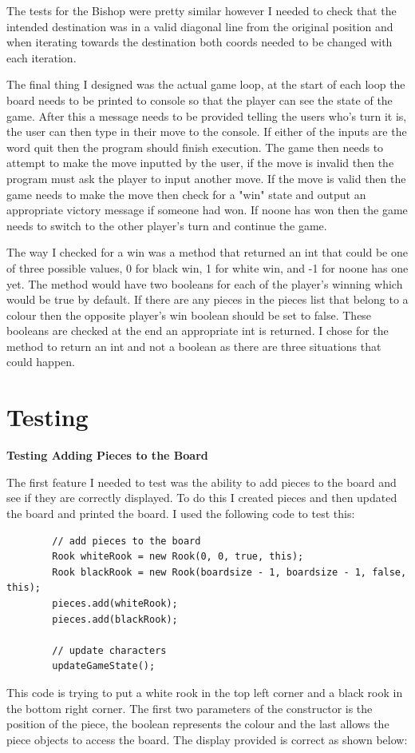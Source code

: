 \documentclass[a4paper]{article}
\begin{document}
The tests for the Bishop were pretty similar however I needed to check that the intended destination was in a valid diagonal line from the original position and when iterating towards the destination both coords needed to be changed with each iteration. 

The final thing I designed was the actual game loop, at the start of each loop the board needs to be printed to console so that the player can see the state of the game. After this a message needs to be provided telling the users who's turn it is, the user can then type in their move to the console. If either of the inputs are the word quit then the program should finish execution. The game then needs to attempt to make the move inputted by the user, if the move is invalid then the program must ask the player to input another move. If the move is valid then the game needs to make the move then check for a "win" state and output an appropriate victory message if someone had won. If noone has won then the game needs to switch to the other player's turn and continue the game.

The way I checked for a win was a method that returned an int that could be one of three possible values, 0 for black win, 1 for white win, and -1 for noone has one yet. The method would have two booleans for each of the player's winning which would be true by default. If there are any pieces in the pieces list that belong to a colour then the opposite player's win boolean should be set to false. These booleans are checked at the end an appropriate int is returned. I chose for the method to return an int and not a boolean as there are three situations that could happen.

\section*{Testing}
\noindent \textbf{Testing Adding Pieces to the Board}

The first feature I needed to test was the ability to add pieces to the board and see if they are correctly displayed. To do this I created pieces and then updated the board and printed the board. I used the following code to test this: \begin{lstlisting}
		// add pieces to the board
        Rook whiteRook = new Rook(0, 0, true, this);
        Rook blackRook = new Rook(boardsize - 1, boardsize - 1, false, this);
        pieces.add(whiteRook);
        pieces.add(blackRook);

        // update characters
        updateGameState();
\end{lstlisting}
This code is trying to put a white rook in the top left corner and a black rook in the bottom right corner. The first two parameters of the constructor is the position of the piece, the boolean represents the colour and the last allows the piece objects to access the board. The display provided is correct as shown below:
\end{document}
